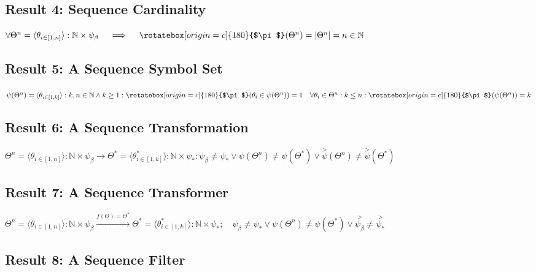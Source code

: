 \documentclass[sigplan,screen]{acmart}
\newcommand{\invpi}[1]{\mathop{\rotatebox[origin=c]{180}{$\pi$}}#1}
\begin{document}
\subsection{Result 4: Sequence Cardinality\cite{adtpaper}\cite{Lutalo2024gtnc}}
\label{RES4}

$\forall \Theta^n = \langle \theta_{i \in [1,n]} \rangle : \mathbb{N} \times \psi_\beta \quad \implies \quad \invpi(\Theta^n) = |\Theta^n| = n \in \mathbb{N}$ 



\subsection{Result 5: A Sequence Symbol Set\cite{ossipaper}\cite{Lutalo2024gtnc}}
\label{RES5}

$\psi(\Theta^n) = \langle \theta_{i \in [1,k]} \rangle : k,n \in \mathbb{N} \land k \geq 1 : \invpi(\theta_i \in \psi(\Theta^n)) = 1 \quad \forall \theta_i \in \Theta^n : k \leq n : \invpi(\psi(\Theta^n)) = k$


\subsection{Result 6: A Sequence Transformation\cite{transformatics}\cite{lnspaper}}

$\Theta^n = \langle \theta_{i \in [1,n]} \rangle : \mathbb{N} \times \psi_\beta \rightarrow \Theta^* = \langle \theta^*_{i \in [1,k]} \rangle : \mathbb{N} \times \psi_* : \psi_\beta \neq \psi_{*} \lor \psi(\Theta^n) \neq \psi(\Theta^*) \lor \overset{>}{\psi}(\Theta^n) \neq \overset{>}{\psi}(\Theta^*)$


\subsection{Result 7: A Sequence Transformer\cite{Lutalo2025transpsy}\cite{transformatics}}
\label{RES7}

$\Theta^n = \langle \theta_{i \in [1,n]} \rangle : \mathbb{N} \times \psi_\beta \xrightarrow{f(\Theta)=\Theta^*} \Theta^* = \langle \theta^*_{i \in [1,k]} \rangle: \mathbb{N} \times \psi_* 
; \quad \psi_\beta \neq \psi_{*} \lor \psi(\Theta^n) \neq \psi(\Theta^*) \lor \overset{>}{\psi_\beta} \neq \overset{>}{\psi_*}$

\subsection{Result 8: A Sequence Filter\cite{transformatics}}
\label{RES8}
\end{document}
